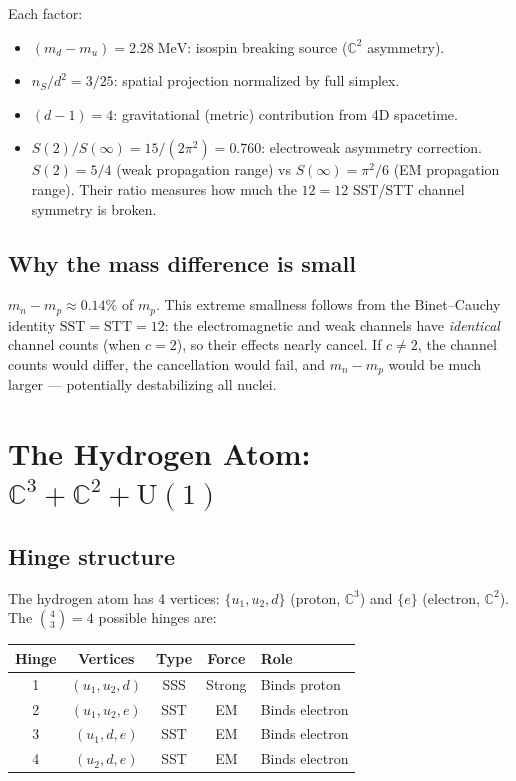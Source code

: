 \documentclass[12pt]{article}
\theoremstyle{remark}
\begin{document}
Each factor:
\begin{itemize}
\item $(m_d - m_u) = 2.28\;\text{MeV}$: isospin breaking source ($\mathbb{C}^2$ asymmetry).
\item $n_S/d^2 = 3/25$: spatial projection normalized by full simplex.
\item $(d-1) = 4$: gravitational (metric) contribution from 4D spacetime.
\item $S(2)/S(\infty) = 15/(2\pi^2) = 0.760$: electroweak asymmetry correction. $S(2) = 5/4$ (weak propagation range) vs $S(\infty) = \pi^2/6$ (EM propagation range). Their ratio measures how much the $12 = 12$ SST/STT channel symmetry is broken.
\end{itemize}

\subsection{Why the mass difference is small}

$m_n - m_p \approx 0.14\%$ of $m_p$. This extreme smallness follows from the Binet--Cauchy identity $\text{SST} = \text{STT} = 12$: the electromagnetic and weak channels have \emph{identical} channel counts (when $c = 2$), so their effects nearly cancel. If $c \neq 2$, the channel counts would differ, the cancellation would fail, and $m_n - m_p$ would be much larger --- potentially destabilizing all nuclei.

\section{The Hydrogen Atom: $\mathbb{C}^3 + \mathbb{C}^2 + \text{U}(1)$}

\subsection{Hinge structure}

The hydrogen atom has 4 vertices: $\{u_1, u_2, d\}$ (proton, $\mathbb{C}^3$) and $\{e\}$ (electron, $\mathbb{C}^2$). The $\binom{4}{3} = 4$ possible hinges are:

\begin{center}
\begin{tabular}{ccccl}
\hline
Hinge & Vertices & Type & Force & Role \\
\hline
1 & $(u_1, u_2, d)$ & SSS & Strong & Binds proton \\
2 & $(u_1, u_2, e)$ & SST & EM & Binds electron \\
3 & $(u_1, d, e)$ & SST & EM & Binds electron \\
4 & $(u_2, d, e)$ & SST & EM & Binds electron \\
\hline
\end{tabular}
\end{center}
\end{document}

